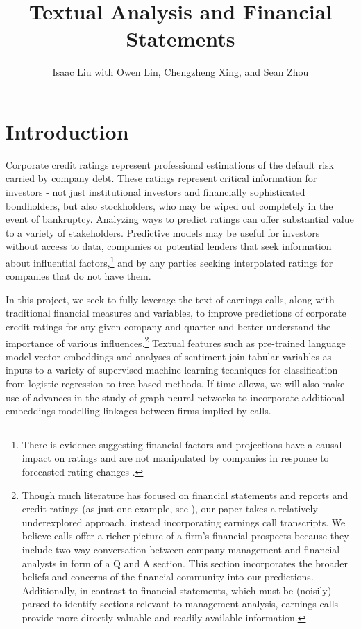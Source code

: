 \documentclass{article}[11pt]
\title{Textual Analysis and Financial Statements}
\author{Isaac Liu with Owen Lin, Chengzheng Xing, and Sean Zhou}
\begin{document}
	\maketitle

    \section*{Introduction}

    Corporate credit ratings represent professional estimations of the default risk carried by company debt. These ratings represent critical information for investors - not just institutional investors and financially sophisticated bondholders, but also stockholders, who may be wiped out completely in the event of bankruptcy. Analyzing ways to predict ratings can offer substantial value to a variety of stakeholders. Predictive models may be useful for investors without access to data, companies or potential lenders that seek information about influential factors,\footnote{There is evidence suggesting financial factors and projections have a causal impact on ratings and are not manipulated by companies in response to forecasted rating changes \citep{he_impact_2018}.} and by any parties seeking interpolated ratings for companies that do not have them.

    In this project, we seek to fully leverage the text of earnings calls, along with traditional financial measures and variables, to improve predictions of corporate credit ratings for any given company and quarter and better understand the importance of various influences.\footnote{Though much literature has focused on financial statements and reports and credit ratings (as just one example, see \cite{makwana_understanding_2022}), our paper takes a relatively underexplored approach, instead incorporating earnings call transcripts. We believe calls offer a richer picture of a firm's financial prospects because they include two-way conversation between company management and financial analysts in form of a Q and A section. This section incorporates the broader beliefs and concerns of the financial community into our predictions. Additionally, in contrast to financial statements, which must be (noisily) parsed to identify sections relevant to management analysis, earnings calls provide more directly valuable and readily available information.} Textual features such as pre-trained language model vector embeddings \citep{araci_finbert_2019} and analyses of sentiment join tabular variables as inputs to a variety of supervised machine learning techniques for classification from logistic regression to tree-based methods. If time allows, we will also make use of advances in the study of graph neural networks to incorporate additional embeddings modelling linkages between firms \citep{das_credit_2023} implied by calls.
\end{document}

